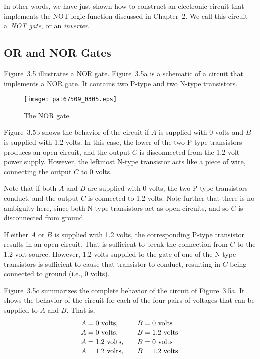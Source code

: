 \documentclass{patt}
\begin{document}
In other words, we have just shown how to construct an electronic
circuit that implements the NOT logic function discussed in Chapter~2.
We call this circuit a~{\em NOT gate}, or an {\em inverter}.

\subsection{OR and NOR Gates}

Figure~3.5 illustrates a NOR gate.  Figure~3.5a is a schematic of a
circuit that implements a NOR gate.  It contains two P-type and two
N-type transistors.

\begin{figure}
\centerline{\texttt{[image: pat67509\_0305.eps]}}
\caption{The NOR gate}\label{fig:nor}
\end{figure}

Figure~3.5b shows the behavior of the circuit if $A$ is supplied with
0 volts and $B$ is supplied with 1.2 volts.  In this case, the lower
of the two P-type transistors produces an open circuit, and the output
$C$ is disconnected from the 1.2-volt power supply.  However, the
leftmost N-type transistor acts like a piece of wire, connecting the
output $C$ to 0 volts.

Note that if both $A$ and $B$ are supplied with 0 volts, the two
P-type transistors conduct, and the output $C$ is connected to 1.2
volts.  Note further that there is no ambiguity here, since both
N-type transistors act as open circuits, and so $C$ is disconnected
from ground.

If either $A$ or $B$ is supplied with 1.2 volts, the corresponding
P-type transistor results in an open circuit.  That is sufficient to
break the connection from $C$ to the 1.2-volt source.  However, 1.2
volts supplied to the gate of one of the N-type transistors is
sufficient to cause that transistor to conduct, resulting in $C$ being
connected to ground (i.e., 0 volts).

Figure~3.5c summarizes the complete behavior of the circuit of
Figure~3.5a.  It shows the behavior of the circuit for each of the
four pairs of voltages that can be supplied to $A$ and $B$.  That is,
\vspace{-0.1in}
\begin{alignat*}{2}
A &= \rm  0~\text{volts}, \quad &   B &= \rm 0~\text{volts} \\[-1.5pt]
A &= \rm  0~\text{volts}, \quad&    B &= \rm 1.2~\text{volts} \\[-1.5pt]
A &= \rm  1.2~\text{volts}, \quad&  B &= \rm 0~\text{volts} \\[-1.5pt]
A &= \rm  1.2~\text{volts}, \quad&  B &= \rm 1.2~\text{volts}
\end{alignat*}
\end{document}
